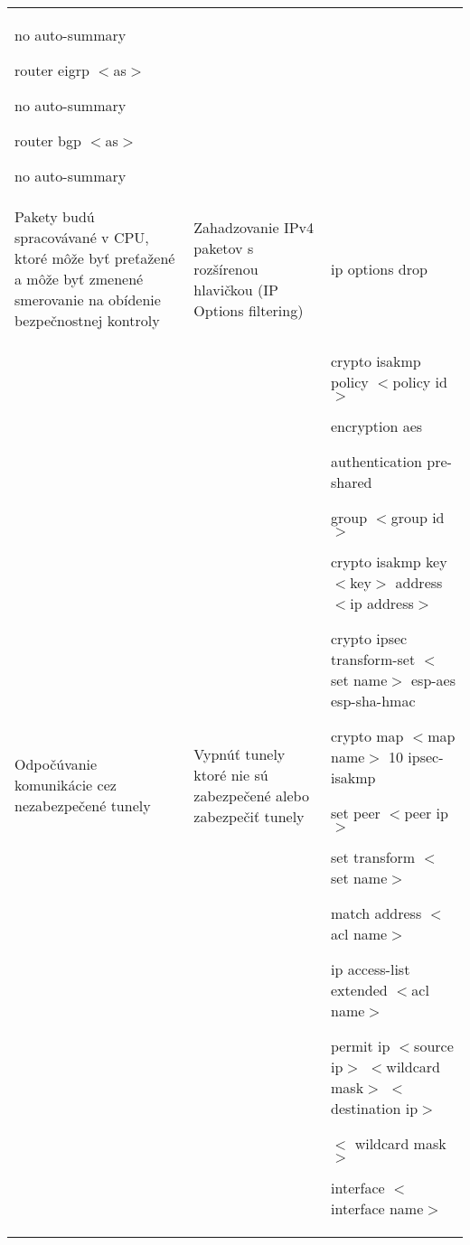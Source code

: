 \begin{longtable}[!htbp]{|L{10em}L{10em}>{\selectfont}L{34em}|}
	\hspace{0.5em}no auto-summary
	
	router eigrp $<$as$>$
	
	\hspace{0.5em}no auto-summary
	
	router bgp $<$as$>$
	
	\hspace{0.5em}no auto-summary\\
	
	
	
	
	Pakety budú spracovávané v CPU, ktoré môže byť preťažené a môže byť zmenené smerovanie na obídenie bezpečnostnej kontroly	&Zahadzovanie IPv4 paketov s rozšírenou hlavičkou (IP Options filtering)	&ip options drop\\
	
	
	
	
	 Odpočúvanie komunikácie  cez nezabezpečené tunely	&Vypnúť tunely ktoré nie sú zabezpečené alebo zabezpečiť tunely	&crypto isakmp policy $<$policy id$>$
	
	\hspace{0.5em}encryption aes
	
	\hspace{0.5em}authentication pre-shared
	
	\hspace{0.5em}group $<$group id$>$
	
	crypto isakmp key $<$key$>$ address $<$ip address$>$ 
	
	crypto ipsec transform-set $<$set name$>$ esp-aes esp-sha-hmac
	
	\hspace{0.5em}crypto map $<$map name$>$ 10 ipsec-isakmp
	
	\hspace{1em}set peer $<$peer ip$>$
	
	\hspace{1em}set transform $<$set name$>$ 
	
	\hspace{1em}match address $<$acl name$>$
	
	ip access-list extended $<$acl name$>$
	
	\hspace{0.5em}permit ip $<$source ip$>$ $<$wildcard mask$>$ $<$destination ip$>$ 
	
	\hspace{1em}$<$ wildcard mask$>$
	
	interface $<$interface name$>$
	

\end{longtable}
